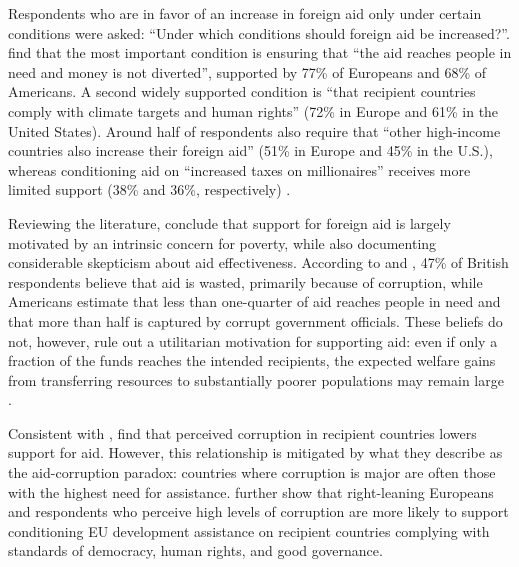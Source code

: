 
Respondents who are in favor of an increase in foreign aid only under certain conditions were asked: ``Under which conditions should foreign aid be increased?''. \citet{fabre_majority_2025} find that the most important condition is ensuring that ``the aid reaches people in need and money is not diverted'', supported by 77\% of Europeans and 68\% of Americans. A second widely supported condition is ``that recipient countries comply with climate targets and human rights'' (72\% in Europe and 61\% in the United States). Around half of respondents also require that ``other high-income countries also increase their foreign aid'' (51\% in Europe and 45\% in the U.S.), whereas conditioning aid on ``increased taxes on millionaires'' receives more limited support (38\% and 36\%, respectively) \citep[Figure 7]{fabre_majority_2025}.

Reviewing the literature, \citet{hudson_mile_2012} conclude that support for foreign aid is largely motivated by an intrinsic concern for poverty, while also documenting considerable skepticism about aid effectiveness. According to \citet{dfid_aid_2009} and \citet{PIPA2001}, 47\% of British respondents believe that aid is wasted, primarily because of corruption, while Americans estimate that less than one-quarter of aid reaches people in need and that more than half is captured by corrupt government officials. These beliefs do not, however, rule out a utilitarian motivation for supporting aid: even if only a fraction of the funds reaches the intended recipients, the expected welfare gains from transferring resources to substantially poorer populations may remain large \citep{kopczuk_limitations_2005}.

Consistent with \citet{henson_public_2010}, \citet{bauhr_corruption_2013} find that perceived corruption in recipient countries lowers support for aid. However, this relationship is mitigated by what they describe as the aid-corruption paradox: countries where corruption is major are often those with the highest need for assistance. \citet{bodenstein_who_2017} further show that right-leaning Europeans and respondents who perceive high levels of corruption are more likely to support conditioning EU development assistance on recipient countries complying with standards of democracy, human rights, and good governance.

